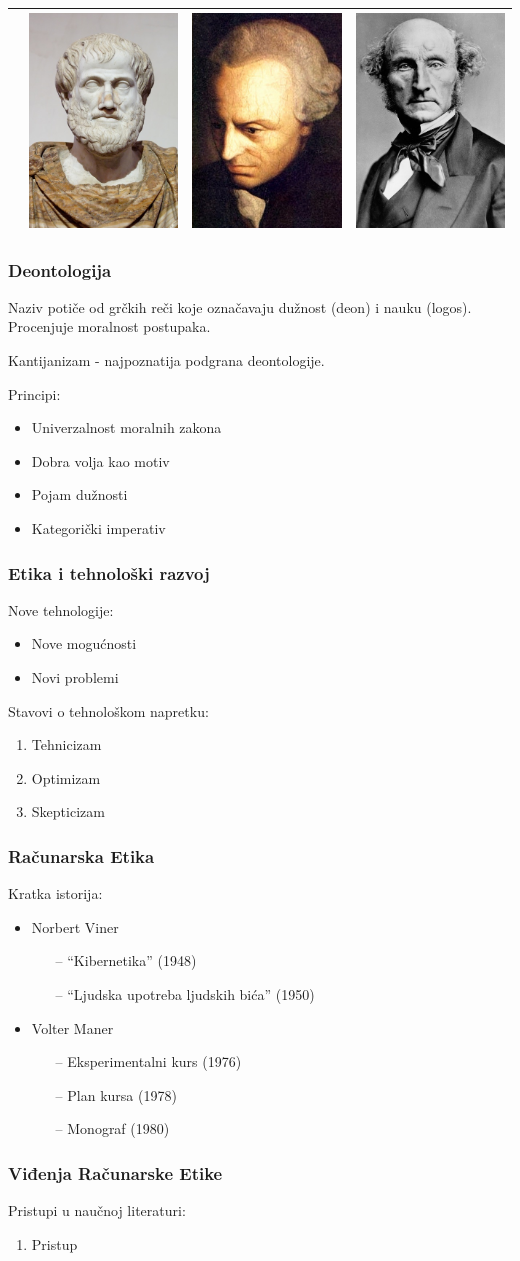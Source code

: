 \documentclass[pdf]{beamer}
\begin{document}
\begin{frame}
\begin{table}
\begin{center}
\begin{tabular}{|l|c|c|c|}
& \includegraphics[scale=.1]{slike/aristotel.jpg} & \includegraphics[scale=.1]{slike/kant.jpg} & \includegraphics[scale=.1]{slike/mil.jpg} \\
\hline
\end{tabular}
\end{center}
\end{table}


\end{frame}

\begin{frame}
\frametitle{Deontologija}

Naziv potiče od grčkih reči koje označavaju dužnost (deon) i nauku (logos). Procenjuje moralnost postupaka.


Kantijanizam - najpoznatija podgrana deontologije.

Principi:
\begin{itemize}
\item{Univerzalnost moralnih zakona}
\item{Dobra volja kao motiv}
\item{Pojam dužnosti} %
\item{Kategorički imperativ}
\end{itemize}

\end{frame}


\begin{frame}
\frametitle{Etika i tehnološki razvoj}

	Nove tehnologije:

	\begin{itemize}

	\item Nove mogućnosti

	\item Novi problemi

	\end{itemize}

	Stavovi o tehnološkom napretku:

	\begin{enumerate}

	\item Tehnicizam %
	\item Optimizam
	\item Skepticizam

	\end{enumerate}

	\end{frame}


\begin{frame}
\frametitle{Računarska Etika}
	
	Kratka istorija:
	\begin{itemize}
	
	\item Norbert Viner
	\begin{itemize}
	\item[--] ``Kibernetika'' (1948) %
	\item[--] ``Ljudska upotreba ljudskih bića'' (1950)
	\end{itemize}
	
	\item Volter Maner
	\begin{itemize}
	\item[--] Eksperimentalni kurs (1976)
	\item[--] Plan kursa (1978)	
	\item[--] Monograf (1980) %
	\end{itemize}
	\end{itemize}
	\end{frame}

\begin{frame}
\frametitle{Viđenja Računarske Etike}

	Pristupi u naučnoj literaturi: %
	\begin{enumerate}
	\item Pristup 
\end{enumerate}
\end{frame}
\end{document}
